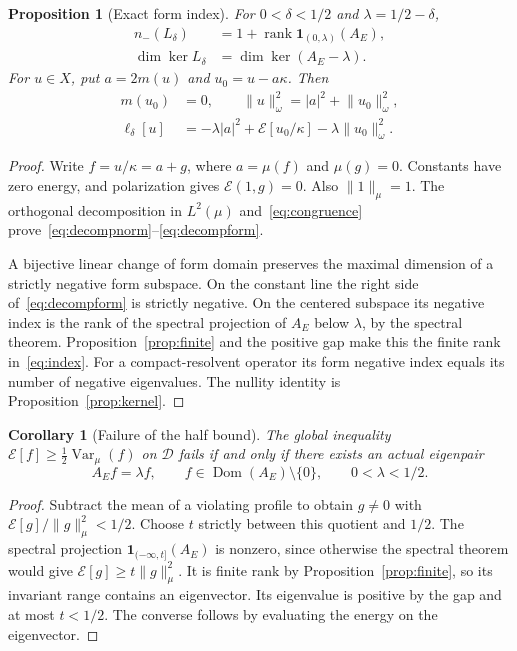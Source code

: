 \documentclass[11pt,a4paper]{article}
\numberwithin{equation}{section}
\newtheorem{proposition}[theorem]{Proposition}
\newtheorem{corollary}[theorem]{Corollary}
\theoremstyle{definition}
\theoremstyle{remark}
\newcommand{\E}{\mathcal E}
\newcommand{\D}{\mathcal D}
\newcommand{\dom}{\operatorname{Dom}}
\newcommand{\Var}{\operatorname{Var}}
\newcommand{\rank}{\operatorname{rank}}
\newcommand{\norm}[1]{\lVert #1\rVert}
\newcommand{\one}{\mathbf 1}
\begin{document}
\begin{proposition}[Exact form index]\label{prop:index}
For $0<\delta<1/2$ and $\lambda=1/2-\delta$,
\begin{align}
 n_-(L_\delta)&=1+\rank\one_{(0,\lambda)}(A_E),\label{eq:index}\\
 \dim\ker L_\delta&=\dim\ker(A_E-\lambda).\label{eq:nullity}
\end{align}
For $u\in X$, put $a=2m(u)$ and $u_0=u-a\kappa$. Then
\begin{align}
 m(u_0)&=0,\qquad
 \norm{u}_\omega^2=|a|^2+\norm{u_0}_\omega^2,\label{eq:decompnorm}\\
 \ell_\delta[u]&=-\lambda|a|^2+
              \E[u_0/\kappa]-\lambda\norm{u_0}_\omega^2.\label{eq:decompform}
\end{align}
\end{proposition}
\begin{proof}
Write $f=u/\kappa=a+g$, where $a=\mu(f)$ and $\mu(g)=0$. Constants have zero energy, and polarization gives $\E(1,g)=0$. Also $\norm{1}_\mu=1$. The orthogonal decomposition in $L^2(\mu)$ and~\eqref{eq:congruence} prove~\eqref{eq:decompnorm}--\eqref{eq:decompform}.

A bijective linear change of form domain preserves the maximal dimension of a strictly negative form subspace. On the constant line the right side of~\eqref{eq:decompform} is strictly negative. On the centered subspace its negative index is the rank of the spectral projection of $A_E$ below $\lambda$, by the spectral theorem. Proposition~\ref{prop:finite} and the positive gap make this the finite rank in~\eqref{eq:index}. For a compact-resolvent operator its form negative index equals its number of negative eigenvalues. The nullity identity is Proposition~\ref{prop:kernel}.
\end{proof}

\begin{corollary}[Failure of the half bound]\label{cor:failure}
The global inequality $\E[f]\ge\tfrac12\Var_\mu(f)$ on $\D$ fails if and only if there exists an actual eigenpair
\[
 A_Ef=\lambda f,\qquad f\in\dom(A_E)\setminus\{0\},\qquad0<\lambda<1/2.
\]
\end{corollary}
\begin{proof}
Subtract the mean of a violating profile to obtain $g\ne0$ with $\E[g]/\norm{g}_\mu^2<1/2$. Choose $t$ strictly between this quotient and $1/2$. The spectral projection $\one_{(-\infty,t]}(A_E)$ is nonzero, since otherwise the spectral theorem would give $\E[g]\ge t\norm{g}_\mu^2$. It is finite rank by Proposition~\ref{prop:finite}, so its invariant range contains an eigenvector. Its eigenvalue is positive by the gap and at most $t<1/2$. The converse follows by evaluating the energy on the eigenvector.
\end{proof}
\end{document}
